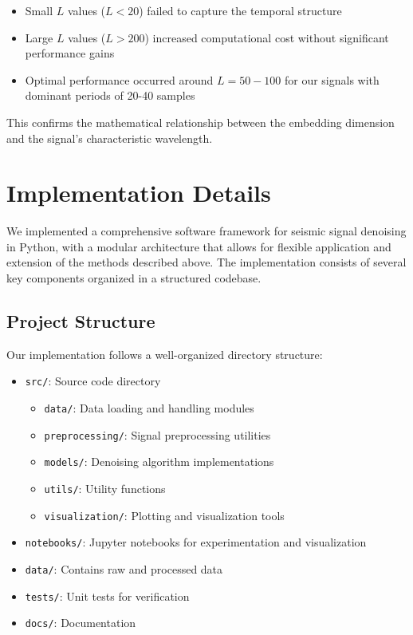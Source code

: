 \documentclass[11pt]{article}
\begin{document}
\begin{itemize}
\item Small $L$ values ($L < 20$) failed to capture the temporal structure
\item Large $L$ values ($L > 200$) increased computational cost without significant performance gains
\item Optimal performance occurred around $L = 50-100$ for our signals with dominant periods of 20-40 samples
\end{itemize}

This confirms the mathematical relationship between the embedding dimension and the signal's characteristic wavelength.

\section{Implementation Details}
We implemented a comprehensive software framework for seismic signal denoising in Python, with a modular architecture that allows for flexible application and extension of the methods described above. The implementation consists of several key components organized in a structured codebase.

\subsection{Project Structure}
Our implementation follows a well-organized directory structure:

\begin{itemize}
\item \texttt{src/}: Source code directory
  \begin{itemize}
  \item \texttt{data/}: Data loading and handling modules
  \item \texttt{preprocessing/}: Signal preprocessing utilities
  \item \texttt{models/}: Denoising algorithm implementations
  \item \texttt{utils/}: Utility functions
  \item \texttt{visualization/}: Plotting and visualization tools
  \end{itemize}
\item \texttt{notebooks/}: Jupyter notebooks for experimentation and visualization
\item \texttt{data/}: Contains raw and processed data
\item \texttt{tests/}: Unit tests for verification
\item \texttt{docs/}: Documentation
\end{itemize}
\end{document}
